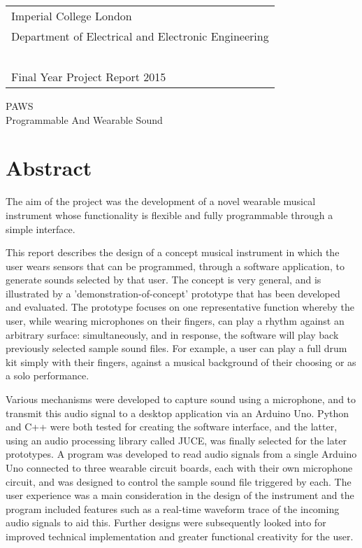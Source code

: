 \thispagestyle{empty}

\large
\begin{tabular}{|l}
Imperial College London\\
Department of Electrical and Electronic Engineering\\~\\
Final Year Project Report 2015
\end{tabular}

\vspace{60 pt}
\begin{center}
\huge PAWS\\
\LARGE Programmable And Wearable Sound\\
\end{center}


\normalsize
\section*{Abstract} \label{Project Specification}

The aim of the project was the development of a novel wearable musical instrument whose functionality is flexible and fully programmable through a simple interface.

This report describes the design of a concept musical instrument in which the user wears sensors that can be programmed, through a software application, to generate sounds selected by that user. The concept is very general, and is illustrated by a 'demonstration-of-concept' prototype that has been developed and evaluated.  The prototype focuses on one representative function whereby the user, while wearing microphones on their fingers, can play a rhythm against an arbitrary surface: simultaneously, and in response, the software will play back previously selected sample sound files. For example, a user can play a full drum kit simply with their fingers, against a musical background of their choosing or as a solo performance.

Various mechanisms were developed to capture sound using a microphone, and to transmit this audio signal to a desktop application via an Arduino Uno. Python and C++ were both tested for creating the software interface, and the latter, using an audio processing library called JUCE, was finally selected for the later prototypes. A program was developed to read audio signals from a single Arduino Uno connected to three wearable circuit boards, each with their own microphone circuit, and was designed to control the sample sound file triggered by each. The user experience was a main consideration in the design of the instrument and the program included features such as a real-time waveform trace of the incoming audio signals to aid this. Further designs were subsequently looked into for improved technical implementation and greater functional creativity for the user.




